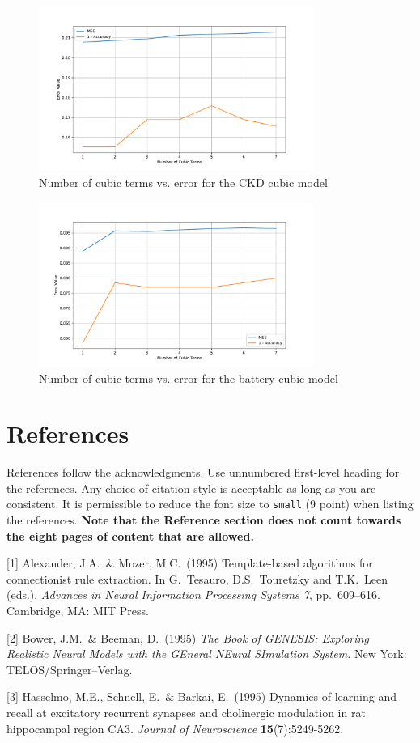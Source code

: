 \documentclass{article}
\begin{document}
\begin{figure}[H]
  \centering
  \includegraphics[width=0.8\textwidth]{cubic_ckd.pdf}
  \caption{Number of cubic terms vs. error for the CKD cubic model}
  \label{fig:quad_ckd}
\end{figure}

\begin{figure}[H]
  \centering
  \includegraphics[width=0.8\textwidth]{cubic_battery.pdf}
  \caption{Number of cubic terms vs. error for the battery cubic model}
  \label{fig:quad_battery}
\end{figure}

\section*{References}

References follow the acknowledgments. Use unnumbered first-level heading for
the references. Any choice of citation style is acceptable as long as you are
consistent. It is permissible to reduce the font size to \verb+small+ (9 point)
when listing the references.
{\bf Note that the Reference section does not count towards the eight pages of content that are allowed.}
\medskip

\small

[1] Alexander, J.A.\ \& Mozer, M.C.\ (1995) Template-based algorithms for
connectionist rule extraction. In G.\ Tesauro, D.S.\ Touretzky and T.K.\ Leen
(eds.), {\it Advances in Neural Information Processing Systems 7},
pp.\ 609--616. Cambridge, MA: MIT Press.

[2] Bower, J.M.\ \& Beeman, D.\ (1995) {\it The Book of GENESIS: Exploring
  Realistic Neural Models with the GEneral NEural SImulation System.}  New York:
TELOS/Springer--Verlag.

[3] Hasselmo, M.E., Schnell, E.\ \& Barkai, E.\ (1995) Dynamics of learning and
recall at excitatory recurrent synapses and cholinergic modulation in rat
hippocampal region CA3. {\it Journal of Neuroscience} {\bf 15}(7):5249-5262.
\end{document}
